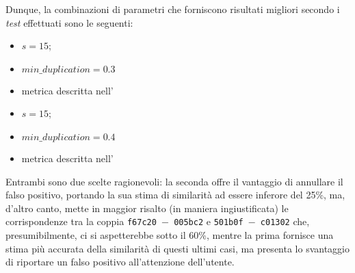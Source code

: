 Dunque, la combinazioni di parametri che forniscono risultati migliori secondo i \textit{test} effettuati sono le seguenti:

\begin{multicols}{2}
    \begin{itemize}
        \item $s = 15$;
        \item $min\_duplication=0.3$
        \item metrica descritta nell'
    \end{itemize}
    
    \begin{itemize}
        \item $s = 15$;
        \item $min\_duplication=0.4$
        \item metrica descritta nell'
    \end{itemize}
\end{multicols}

Entrambi sono due scelte ragionevoli: la seconda offre il vantaggio di annullare il falso positivo, portando la sua stima di similarità ad essere inferore del 25\%, ma, d'altro canto, mette in maggior risalto (in maniera ingiustificata) le corrispondenze tra la coppia \texttt{f67c20 $-$ 005bc2} e \texttt{501b0f $-$ c01302} che, presumibilmente, ci si aspetterebbe sotto il 60\%, mentre la prima fornisce una stima più accurata della similarità di questi ultimi casi, ma presenta lo svantaggio di riportare un falso positivo all'attenzione dell'utente.

